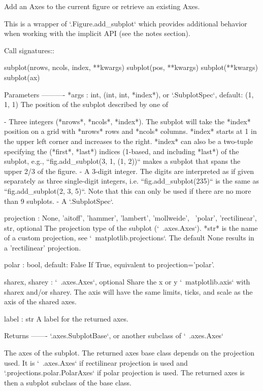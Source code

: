 \begin{DoxyVerb}Add an Axes to the current figure or retrieve an existing Axes.

This is a wrapper of `.Figure.add_subplot` which provides additional
behavior when working with the implicit API (see the notes section).

Call signatures::

   subplot(nrows, ncols, index, **kwargs)
   subplot(pos, **kwargs)
   subplot(**kwargs)
   subplot(ax)

Parameters
----------
*args : int, (int, int, *index*), or `.SubplotSpec`, default: (1, 1, 1)
    The position of the subplot described by one of

    - Three integers (*nrows*, *ncols*, *index*). The subplot will take the
      *index* position on a grid with *nrows* rows and *ncols* columns.
      *index* starts at 1 in the upper left corner and increases to the
      right. *index* can also be a two-tuple specifying the (*first*,
      *last*) indices (1-based, and including *last*) of the subplot, e.g.,
      ``fig.add_subplot(3, 1, (1, 2))`` makes a subplot that spans the
      upper 2/3 of the figure.
    - A 3-digit integer. The digits are interpreted as if given separately
      as three single-digit integers, i.e. ``fig.add_subplot(235)`` is the
      same as ``fig.add_subplot(2, 3, 5)``. Note that this can only be used
      if there are no more than 9 subplots.
    - A `.SubplotSpec`.

projection : {None, 'aitoff', 'hammer', 'lambert', 'mollweide', \
'polar', 'rectilinear', str}, optional
    The projection type of the subplot (`~.axes.Axes`). *str* is the name
    of a custom projection, see `~matplotlib.projections`. The default
    None results in a 'rectilinear' projection.

polar : bool, default: False
    If True, equivalent to projection='polar'.

sharex, sharey : `~.axes.Axes`, optional
    Share the x or y `~matplotlib.axis` with sharex and/or sharey. The
    axis will have the same limits, ticks, and scale as the axis of the
    shared axes.

label : str
    A label for the returned axes.

Returns
-------
`.axes.SubplotBase`, or another subclass of `~.axes.Axes`

    The axes of the subplot. The returned axes base class depends on
    the projection used. It is `~.axes.Axes` if rectilinear projection
    is used and `.projections.polar.PolarAxes` if polar projection
    is used. The returned axes is then a subplot subclass of the
    base class.


\end{DoxyVerb}
